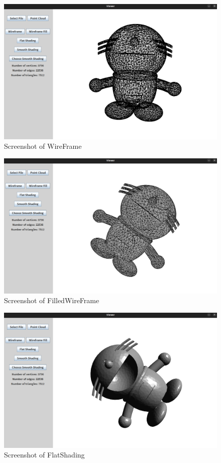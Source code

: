 \documentclass[12pt]{article}
\begin{document}
\begin{figure}[h]
    \centering
    \includegraphics[width=1.0\textwidth]{sc2.png}
    \caption{Screenshot of WireFrame}
    \label{fig:my_label}
\end{figure}

\begin{figure}[h]
    \centering
    \includegraphics[width=1.0\textwidth]{sc3.png}
    \caption{Screenshot of FilledWireFrame}
    \label{fig:my_label}
\end{figure}

\begin{figure}[h]
    \centering
    \includegraphics[width=1.0\textwidth]{sc4.png}
    \caption{Screenshot of FlatShading}
    \label{fig:my_label}
\end{figure}
\end{document}
